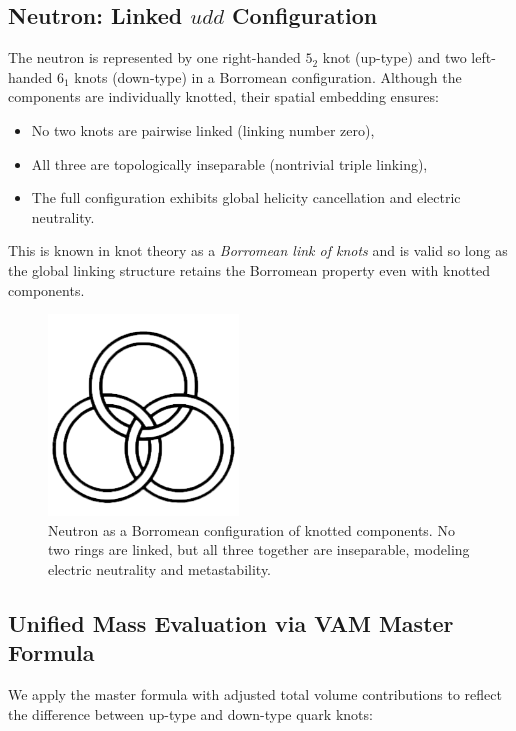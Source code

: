 \subsection{Neutron: Linked \(udd\) Configuration}

The neutron is represented by one right-handed \( 5_2 \) knot (up-type) and two left-handed \( 6_1 \) knots (down-type) in a Borromean configuration. Although the components are individually knotted, their spatial embedding ensures:

\begin{itemize}
    \item No two knots are pairwise linked (linking number zero),
    \item All three are topologically inseparable (nontrivial triple linking),
    \item The full configuration exhibits global helicity cancellation and electric neutrality.
\end{itemize}

This is known in knot theory as a \emph{Borromean link of knots} and is valid so long as the global linking structure retains the Borromean property even with knotted components.

\begin{figure}[H]
    \centering
    \includegraphics[width=0.45\textwidth]{images/borromean}
    \caption{Neutron as a Borromean configuration of knotted components. No two rings are linked, but all three together are inseparable, modeling electric neutrality and metastability.}
\end{figure}

\subsection{Unified Mass Evaluation via VAM Master Formula}

We apply the master formula with adjusted total volume contributions to reflect the difference between up-type and down-type quark knots:

